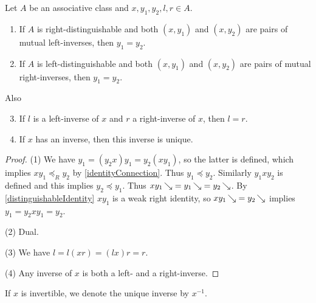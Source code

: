 \begin{proposition} \label{inverseUniqueness}
Let $A$ be an associative class and $x,y_1,y_2,l,r \in A$.
\begin{enumerate}
\item If $A$ is right-distinguishable and both $(x, y_1)$ and $(x,y_2)$ are pairs of mutual left-inverses, then $y_1 = y_2$.
\item If $A$ is left-distinguishable and both $(x, y_1)$ and $(x,y_2)$ are pairs of mutual right-inverses, then $y_1 = y_2$.
\end{enumerate}
Also
\begin{enumerate} \setcounter{enumi}{2}
\item If $l$ is a left-inverse of $x$ and $r$ a right-inverse of $x$, then $l = r$.
\item If $x$ has an inverse, then this inverse is unique.
\end{enumerate}
\end{proposition}
\begin{proof}
(1) We have $y_1 = (y_2x)y_1 = y_2(xy_1)$, so the latter is defined, which implies $xy_1 \preceq_R y_2$ by \ref{identityConnection}. Thus $y_1 \preceq y_2$. Similarly $y_1xy_2$ is defined and this implies $y_2 \preceq y_1$. Thus $xy_1\mathop{\searrow} = y_1\mathop{\searrow} = y_2\mathop{\searrow}$. By \ref{distinguishableIdentity} $xy_1$ is a weak right identity, so $xy_1\mathop{\searrow} = y_2\mathop{\searrow}$ implies $y_1 = y_2xy_1 = y_2$.

(2) Dual.

(3) We have $l = l(xr) = (lx)r = r$.

(4) Any inverse of $x$ is both a left- and a right-inverse.
\end{proof}

If $x$ is invertible, we denote the unique inverse by $x^{-1}$.




